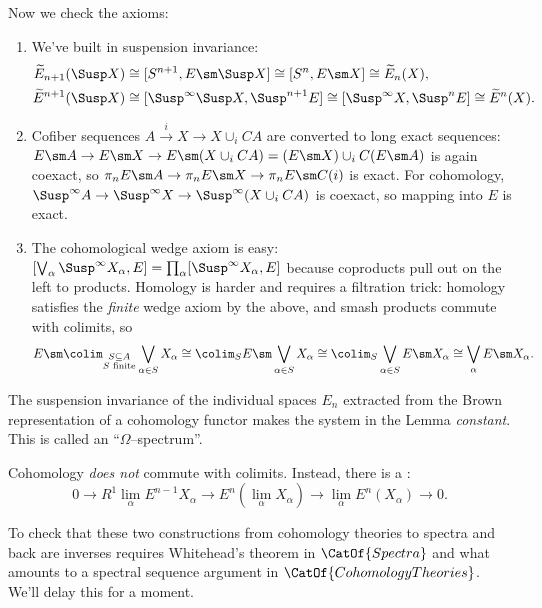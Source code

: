 Now we check the axioms:
\begin{enumerate}
    \item We've built in suspension invariance:
    \begin{align*}
    \widetilde E_{n+1}(\Susp X) & \cong [S^{n+1}, E \sm \Susp X] \cong [S^n, E \sm X] \cong \widetilde E_n(X), \\
    \widetilde E^{n+1}(\Susp X) & \cong [\Susp^\infty \Susp X, \Susp^{n+1} E] \cong [\Susp^\infty X, \Susp^n E] \cong \widetilde E^n(X).
    \end{align*}
    \item Cofiber sequences $A \xrightarrow i X \to X \cup_i CA$ are converted to long exact sequences: $E \sm A \to E \sm X \to E \sm (X \cup_i CA) = (E \sm X) \cup_i C(E \sm A)$ is again coexact, so $\pi_n E \sm A \to \pi_n E \sm X \to \pi_n E \sm C(i)$ is exact.  For cohomology, $\Susp^\infty A \to \Susp^\infty X \to \Susp^\infty (X \cup_i CA)$ is coexact, so mapping into $E$ is exact.
    \item The cohomological wedge axiom is easy: $[\bigvee_\alpha \Susp^\infty X_\alpha, E] = \prod_\alpha [\Susp^\infty X_\alpha, E]$ because coproducts pull out on the left to products.  Homology is harder and requires a filtration trick: homology satisfies the \emph{finite} wedge axiom by the above, and smash products commute with colimits, so \[E \sm \colim_{\substack{S \subseteq A \\ \text{$S$ finite}}} \bigvee_{\alpha \in S} X_\alpha \cong \colim_S E \sm \bigvee_{\alpha \in S} X_\alpha \cong \colim_S \bigvee_{\alpha \in S} E \sm X_\alpha \cong \bigvee_\alpha E \sm X_\alpha.\]
\end{enumerate}

\begin{remark}
The suspension invariance of the individual spaces $E_n$ extracted from the Brown representation of a cohomology functor makes the system in the Lemma \emph{constant}.  This is called an ``$\Omega$--spectrum''.
\end{remark}

\begin{remark}
Cohomology \emph{does not} commute with colimits.  Instead, there is a : \[0 \to R^1 \lim_\alpha E^{n-1} X_\alpha \to E^n(\lim_\alpha X_\alpha) \to \lim_\alpha E^n(X_\alpha) \to 0.\]
\end{remark}

\begin{remark}
To check that these two constructions from cohomology theories to spectra and back are inverses requires Whitehead's theorem in $\CatOf{Spectra}$ and what amounts to a spectral sequence argument in $\CatOf{CohomologyTheories}$.  We'll delay this for a moment.
\end{remark}

